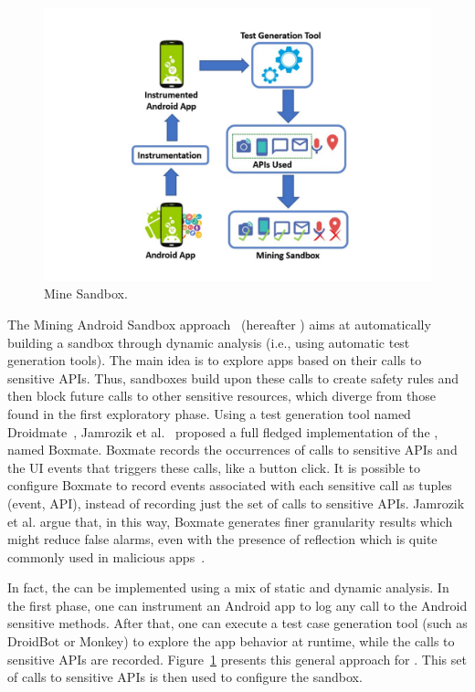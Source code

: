 \begin{figure}[ht]
\centering
\includegraphics[scale=0.35]{images/mineSandbox.pdf}
\caption{Mine Sandbox.}
 \label{fig:mineSandbox}
\end{figure}

The Mining Android Sandbox approach~\cite{DBLP:conf/icse/JamrozikSZ16} (hereafter \mas) aims at automatically
building a sandbox through dynamic analysis (i.e., using automatic test generation tools).
The main idea is to explore apps based on their calls to sensitive APIs.
Thus, sandboxes build upon these calls to create safety rules and then block future
calls to other sensitive resources, which diverge from those found in the first exploratory
phase. Using a test generation tool named Droidmate~\cite{DBLP:conf/icse/JamrozikZ16},
Jamrozik et al.~\cite{DBLP:conf/icse/JamrozikSZ16} proposed a full fledged
implementation of the \mas, named Boxmate. 
Boxmate records the occurrences of calls to sensitive APIs and the UI events that triggers these calls,
like a button click. It is possible to configure Boxmate to record events associated with each sensitive call as
tuples (event, API), instead of recording just the set of calls to sensitive APIs. Jamrozik et al. argue that, in this way, Boxmate generates finer granularity results which
might reduce false alarms, even with the presence of reflection which is quite commonly used in
malicious apps~\cite{DBLP:conf/issta/0029BOK16}.

In fact, the \mas can be implemented using
a mix of static and dynamic analysis. In the first phase, one
can instrument an Android app to log any call to the Android sensitive methods.
After that, one can execute a test case generation tool (such as DroidBot
or Monkey) to explore the app behavior at runtime,
while the calls to sensitive APIs are recorded.
Figure~\ref{fig:mineSandbox} presents this general approach for \mas. This set of calls to sensitive APIs is then used
to configure the sandbox. 

